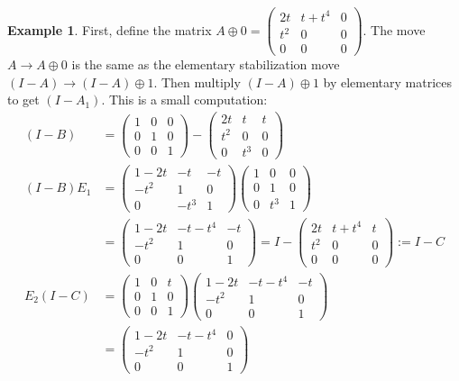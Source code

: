 \documentclass{amsart}
\theoremstyle{definition}
\newtheorem{ex}[equation]{Example}
\theoremstyle{definition}
\numberwithin{equation}{subsection}
\begin{document}
\begin{ex}
First, define the matrix
$A\oplus 0  = \begin{pmatrix}  2t & t + t^4 & 0\\
t^2&0& 0\\ 0&0&0  \end{pmatrix}$.
The move $A \to A\oplus 0$
is the same as the elementary stabilization move
$(I-A) \to (I-A)\oplus 1$.
Then  multiply $(I-A)\oplus 1$ by elementary matrices
to get $(I-A_1)$. This is a small computation:
\begin{align*}
(I-B)&=
\begin{pmatrix}  1 & 0 & 0 \\ 0&1&0 \\ 0 & 0 & 1
\end{pmatrix}
-    \begin{pmatrix}  2t & t & t \\ t^2&0&0 \\ 0 &t^3 & 0
\end{pmatrix} \\
(I-B)E_1 &=
\begin{pmatrix}  1-2t & -t & -t \\ -t^2&1&0 \\ 0 &-t^3 & 1
\end{pmatrix}
\begin{pmatrix} 1&0&0 \\ 0&1&0 \\ 0& t^3 & 1 \end{pmatrix} \\
& =  \begin{pmatrix}  1-2t & -t -t^4 & -t \\ -t^2&1&0 \\ 0 &0 & 1
\end{pmatrix}
= I -  \begin{pmatrix}  2t & t +t^4 & t \\ t^2&0&0 \\ 0 &0 & 0
\end{pmatrix}
:= I-C
\\
E_2 (I-C) &=
\begin{pmatrix} 1&0&t \\ 0&1&0 \\ 0& 0 & 1 \end{pmatrix}
\begin{pmatrix}  1-2t & -t -t^4 & -t \\ -t^2&1&0 \\ 0 &0 & 1
\end{pmatrix} \\
& =
\begin{pmatrix}  1-2t & -t -t^4 & 0 \\ -t^2&1&0 \\ 0 &0 & 1

\end{pmatrix}
\end{align*}
\end{ex}
\end{document}
